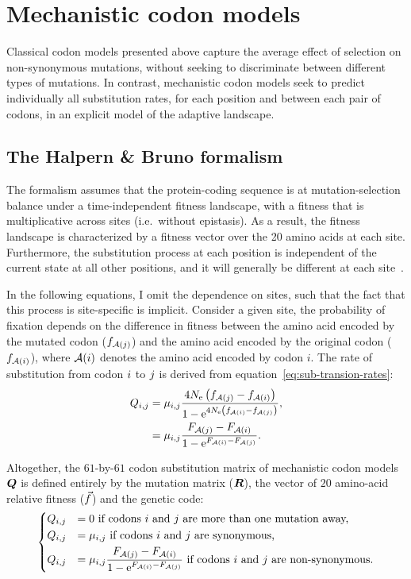 \section{Mechanistic {codon} models}
\label{sec:intro-mechanistic-codon-models}

Classical codon models presented above capture the average effect of selection on non-synonymous mutations, without seeking to discriminate between different types of mutations.
In contrast, mechanistic codon models seek to predict individually all substitution rates, for each position and between each pair of codons, in an explicit model of the adaptive landscape.

\subsection{The Halpern \& Bruno formalism}
\label{subsec:HB-formalism}

The \citet{Halpern1998} formalism assumes that the protein-coding sequence is at mutation-selection balance under a time-independent fitness landscape, with a fitness that is multiplicative across sites (i.e.~without epistasis).
As a result, the fitness landscape is characterized by a fitness vector over the 20 amino acids at each site.
Furthermore, the substitution process at each position is independent of the current state at all other positions, and it will generally be different at each site~\citep{Rodrigue2010, Tamuri2012}.

In the following equations, I omit the dependence on sites, such that the fact that this process is site-specific is implicit.
Consider a given site, the probability of fixation depends on the difference in fitness between the amino acid encoded by the mutated codon ($f_{\mathcal{A}({j})}$) and the amino acid encoded by the original codon ($f_{\mathcal{A}({i})}$), where $\mathcal{A}({i})$ denotes the amino acid encoded by codon $i$.
The rate of substitution from codon ${i}$ to ${j}$ is derived from equation~\ref{eq:sub-transion-rates}:
\begin{align}
    Q_{{i}, {j}} & = \mu_{{i}, {j}} \dfrac{4 N_{\text{e}} \left({f_{\mathcal{A}({j})} - f_{\mathcal{A}({i})}}\right)}{{1 - \text{e}^{4 N_{\text{e}} \left({f_{\mathcal{A}({i})} - f_{\mathcal{A}({j})}}\right)} }}, \\
    & = \mu_{{i}, {j}} \dfrac{F_{\mathcal{A}({j})} - F_{\mathcal{A}({i})}}{1 - \text{e}^{F_{\mathcal{A}({i})} - F_{\mathcal{A}({j})}} }.
\end{align}

Altogether, the $61$-by-$61$ codon substitution matrix of mechanistic codon models $\bm{Q}$ is defined entirely by the mutation matrix ($\bm{R}$), the vector of $20$ amino-acid relative fitness ($\vec{f}$) and the genetic code:
\begin{equation}
    \begin{dcases}
        Q_{{i}, {j}} & = 0 \text{ if codons ${i}$ and ${j}$ are more than one mutation away,} \\
        Q_{{i}, {j}} & = \mu_{{i}, {j}} \text{ if codons ${i}$ and ${j}$ are synonymous,} \\
        Q_{{i}, {j}} & = \mu_{{i}, {j}} \dfrac{F_{\mathcal{A}({j})} - F_{\mathcal{A}({i})}}{1 - \text{e}^{F_{\mathcal{A}({i})} - F_{\mathcal{A}({j})}} } \text{ if codons ${i}$ and ${j}$ are non-synonymous}.
    \end{dcases}
    \label{eq:propensities-models}
\end{equation}

